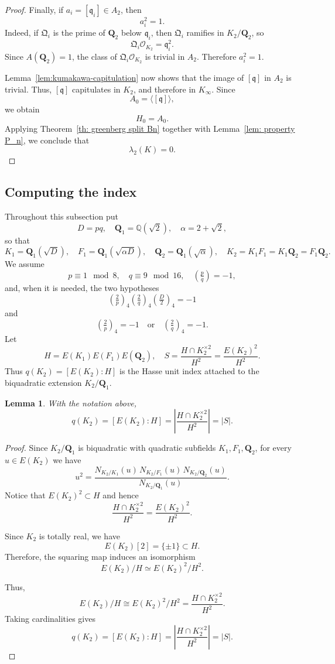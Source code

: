 \documentclass{article}
\numberwithin{equation}{section}
\theoremstyle{plain}  %
\newtheorem{lemma}{Lemma}[section]
\theoremstyle{definition}
\newcommand{\Q}{\mathbb{Q}}
\newcommand{\kron}[2]{\left( \tfrac{#1}{#2} \right)}
\newcommand{\fk}{\mathfrak }
\begin{document}
\begin{proof}
Finally, if $a_i=[\fk q_i]\in A_2$, then
$$
a_i^2=1.
$$
Indeed, if $\fk Q_i$ is the prime of $\mathbf Q_2$ below
$\fk q_i$, then $\fk Q_i$ ramifies in $K_2/\mathbf Q_2$, so
$$
\fk Q_i\mathcal O_{K_2}=\fk q_i^2.
$$
Since $A(\mathbf Q_2)=1$, the class of $\fk Q_i\mathcal O_{K_2}$ is
trivial in $A_2$. Therefore $a_i^2=1$.

Lemma~\ref{lem:kumakawa-capitulation} now shows that the image of
$[\fk q]$ in $A_2$ is trivial. Thus, $[\fk q]$ capitulates in
$K_2$, and therefore in $K_\infty$. Since
$$
A_0=\langle[\fk q]\rangle,
$$
we obtain
$$
H_0=A_0.
$$
Applying Theorem~\ref{th: greenberg split Bn} together with
Lemma~\ref{lem: property P_n}, we conclude that
$$
\lambda_2(K)=0.
$$
\end{proof}

\subsection{Computing the index}

Throughout this subsection put
$$
D=pq, \quad \mathbf Q_1=\Q(\sqrt 2), \quad \alpha=2+\sqrt 2,
$$
so that
$$
K_1=\mathbf Q_1(\sqrt D), \quad F_1=\mathbf Q_1(\sqrt{\alpha D}), \quad \mathbf Q_2=\mathbf Q_1(\sqrt \alpha), \quad K_2=K_1F_1=K_1\mathbf Q_2=F_1 \mathbf Q_2.
$$
We assume
$$
p \equiv 1 \mod 8, \quad q \equiv 9 \mod {16}, \quad \kron{p}{q}=-1,
$$
and, when it is needed, the two hypotheses
$$
\kron{2}{p}_4\kron{2}{q}_4\kron{D}{2}_4=-1
$$
and
$$
\kron{2}{p}_4=-1 \quad \text{or} \quad \kron{2}{q}_4=-1.
$$
Let
$$
H=E(K_1)E(F_1)E(\mathbf Q_2), \quad S=\frac{H \cap K_2^{\times 2}}{H^2}=\frac{E(K_2)^2}{H^2}.
$$ 
Thus $q(K_2)=[E(K_2):H]$ is the Hasse unit index attached to the biquadratic extension $K_2/\mathbf Q_1$.

\begin{lemma}\label{lem:wada-description}
With the notation above,
$$
q(K_2)=[E(K_2):H]
=
\left|\frac{H\cap K_2^{\times 2}}{H^2}\right|
=
|S|.
$$
\end{lemma}

\begin{proof}
Since $K_2/\mathbf Q_1$ is biquadratic with quadratic subfields
$K_1,F_1,\mathbf Q_2$, for every $u\in E(K_2)$ we have
\[
u^2
=
\frac{
N_{K_2/K_1}(u)\,N_{K_2/F_1}(u)\,N_{K_2/\mathbf Q_2}(u)
}{
N_{K_2/\mathbf Q_1}(u)
}.
\]
Notice that  $E(K_2)^2\subset H$ and hence
\[
\frac{H\cap K_2^{\times 2}}{H^2}
=
\frac{E(K_2)^2}{H^2}.
\]

Since $K_2$ is totally real, we have
\[
E(K_2)[2]=\{\pm 1\}\subset H.
\]
Therefore, the squaring map induces an isomorphism
\[
E(K_2)/H \simeq E(K_2)^2/H^2.
\]

Thus,
\[
E(K_2)/H\cong E(K_2)^2/H^2
=
\frac{H\cap K_2^{\times 2}}{H^2}.
\]
Taking cardinalities gives
\[
q(K_2)=[E(K_2):H]
=
\left|\frac{H\cap K_2^{\times 2}}{H^2}\right|
=
|S|.
\]
\end{proof}
\end{document}

